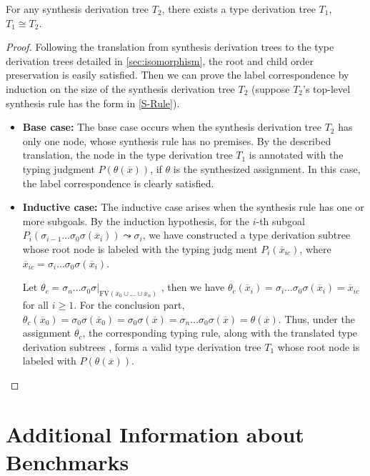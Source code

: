\documentclass[manuscript,screen]{acmart}
\newcommand{\mvhzc}{\text{FV}}
\begin{document}
\begin{lemma}
For any synthesis derivation tree $T_2$, there exists a type derivation tree $T_1$, $T_1 \cong T_2$.
\end{lemma}
\begin{proof}
  Following the translation from synthesis derivation trees to the type derivation trees detailed in \autoref{sec:isomorphism}, the root and child order preservation is easily satisfied. Then we can prove the label correspondence by induction on the size of the synthesis derivation tree $T_2$ (suppose $T_2$'s top-level synthesis rule has the form in \autoref{S-Rule}).

  \begin{itemize}
     \item \textbf{Base case:} The base case occurs when the synthesis derivation tree $T_2$ has only one node, whose synthesis rule has no premises. By the described translation, the node in the type derivation tree $T_1$ is annotated with the typing judgment $P(\theta(\overline{x}))$, if $\theta$ is the synthesized assignment. In this case, the label correspondence is clearly satisfied.
     \item \textbf{Inductive case:} The inductive case arises when the synthesis rule has one or more subgoals. 
     By the induction hypothesis, for the $i$-th subgoal $P_i(\sigma_{i-1}\ldots\sigma_0\sigma(\overline{x}_i)) \leadsto \sigma_i$, we have constructed a    {\color{revblue}type derivation subtree } whose root node is labeled with the typing judg  ment $P_i(\overline{x}_{ic})$, where $\overline{x}_{ic}=\sigma_{i}\ldots\sigma_0\sigma(\overline{x}_i)$. 

     Let    {\color{revblue}$\theta_c=\sigma_{n}\ldots\sigma_0\sigma|_{\mvhzc(\overline{x}_0\cup\ldots\cup\overline{x}_n)}$} , then we have $\theta_c(\overline{x}_{i})=\sigma_{i}\ldots\sigma_0\sigma(\overline{x}_i)=\overline{x}_{ic}$ for all $i\geq 1$. 
     For the conclusion part, $\theta_c(\overline{x}_{0})=\sigma_0\sigma(\overline{x}_0)=\sigma_0\sigma(\overline{x})=\sigma_n \ldots \sigma_0\sigma(\overline{x})=\theta(\overline{x})$. 
     Thus, under the assignment $\theta_c$, the corresponding typing rule, along with the translated    {\color{revblue}type derivation subtrees} , forms a valid type derivation tree $T_1$ whose root node is labeled with $P(\theta(\overline{x}))$.
 \end{itemize}
\end{proof}

 \section{Additional Information about Benchmarks}
\label{appendix-benchmark}
\end{document}
